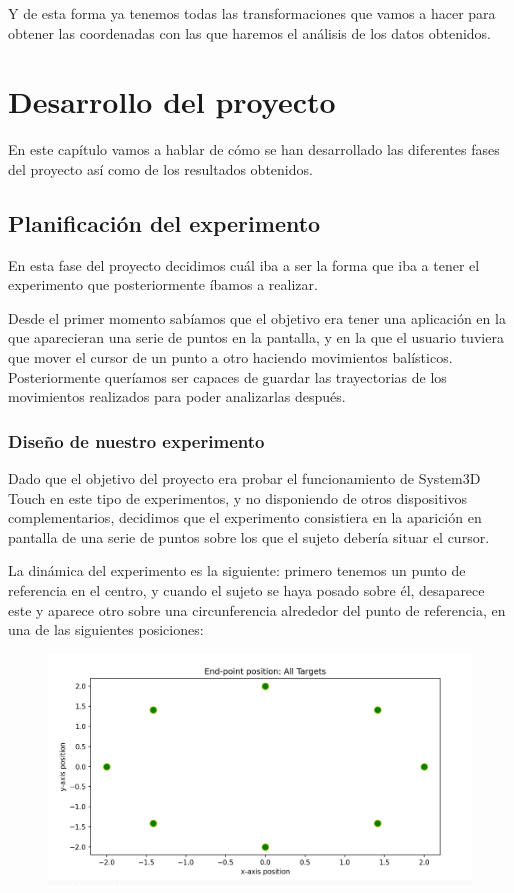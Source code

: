 \documentclass[a4paper,11pt, oneside]{book}
\begin{document}
Y de esta forma ya tenemos todas las transformaciones que vamos a hacer para obtener las coordenadas con las que haremos el análisis de los datos obtenidos.


\chapter{Desarrollo del proyecto}




En este capítulo vamos a hablar de cómo se han desarrollado las diferentes fases del proyecto así como de los resultados obtenidos.

\section{Planificación del experimento}

En esta fase del proyecto decidimos cuál iba a ser la forma que iba a tener el experimento que posteriormente íbamos a realizar.

Desde el primer momento sabíamos que el objetivo era tener una aplicación en la que aparecieran una serie de puntos en la pantalla, y en la que el usuario tuviera que mover el cursor de un punto a otro haciendo movimientos balísticos. Posteriormente queríamos ser capaces de guardar las trayectorias de los movimientos realizados para poder analizarlas después.



\subsection{Diseño de nuestro experimento}

Dado que el objetivo del proyecto era probar el funcionamiento de System3D Touch en este tipo de experimentos, y no disponiendo de otros dispositivos complementarios, decidimos que el experimento consistiera en la aparición en pantalla de una serie de puntos sobre los que el sujeto debería situar el cursor.

La dinámica del experimento es la siguiente: primero tenemos un punto de referencia en el centro, y cuando el sujeto se haya posado sobre él, desaparece este y aparece otro sobre una circunferencia alrededor del punto de referencia, en una de las siguientes posiciones:
\begin{figure}[H]
	
	\centering
	\includegraphics[width=0.7\linewidth]{points}
	\label{fig:figura1}
	
\end{figure}
\end{document}
